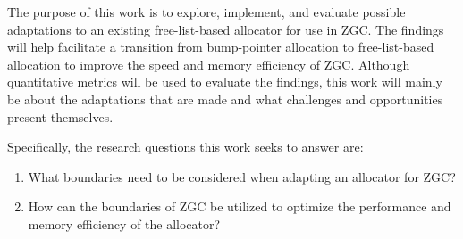
The purpose of this work is to explore, implement, and evaluate possible adaptations to an existing free-list-based allocator for use in ZGC. The findings will help facilitate a transition from bump-pointer allocation to free-list-based allocation to improve the speed and memory efficiency of ZGC. Although quantitative metrics will be used to evaluate the findings, this work will mainly be about the adaptations that are made and what challenges and opportunities present themselves.

Specifically, the research questions this work seeks to answer are:

\begin{enumerate}
    \item What boundaries need to be considered when adapting an allocator for ZGC?
    \item How can the boundaries of ZGC be utilized to optimize the performance and memory efficiency of the allocator?
\end{enumerate}

